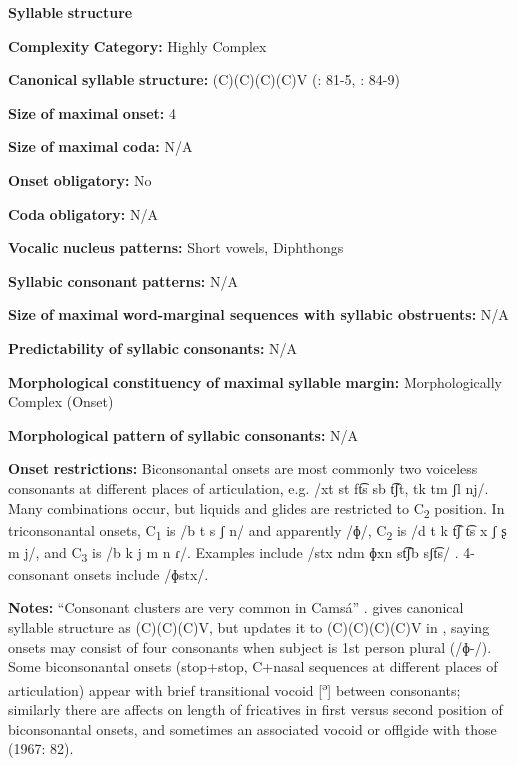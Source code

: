 \textbf{Syllable} \textbf{structure}

\textbf{Complexity} \textbf{Category:} Highly Complex

\textbf{Canonical} \textbf{syllable} \textbf{structure:} (C)(C)(C)(C)V (\citealt{Howard1967}: 81-5, \citealt{Howard1972}: 84-9)

\textbf{Size} \textbf{of} \textbf{maximal} \textbf{onset:} 4

\textbf{Size} \textbf{of} \textbf{maximal} \textbf{coda:} N/A

\textbf{Onset} \textbf{obligatory:} No

\textbf{Coda} \textbf{obligatory:} N/A

\textbf{Vocalic} \textbf{nucleus} \textbf{patterns:} Short vowels, Diphthongs

\textbf{Syllabic} \textbf{consonant} \textbf{patterns:} N/A

\textbf{Size} \textbf{of} \textbf{maximal} \textbf{word{}-marginal sequences with syllabic obstruents:} N/A

\textbf{Predictability} \textbf{of} \textbf{syllabic} \textbf{consonants:} N/A

\textbf{Morphological} \textbf{constituency} \textbf{of} \textbf{maximal} \textbf{syllable} \textbf{margin:} Morphologically Complex (Onset)

\textbf{Morphological} \textbf{pattern} \textbf{of} \textbf{syllabic} \textbf{consonants:} N/A

\textbf{Onset} \textbf{restrictions:} Biconsonantal onsets are most commonly two voiceless consonants at different places of articulation, e.g. /xt st ft͡s sb t͡ʃt, tk tm ʃl nj/. Many combinations occur, but liquids and glides are restricted to C\textsubscript{2} position. In triconsonantal onsets, C\textsubscript{1} is /b t s ʃ n/ and apparently /ɸ/, C\textsubscript{2} is /d t k t͡ʃ t͡s x ʃ ʂ m j/, and C\textsubscript{3} is /b k j m n ɾ/. Examples include /stx ndm ɸxn st͡ʃb sʃt͡s/ . 4-consonant onsets include /ɸstx/.

\textbf{Notes:} “Consonant clusters are very common in Camsá” \citep[81]{Howard1967}. \citet{Howard1967} gives canonical syllable structure as (C)(C)(C)V, but updates it to (C)(C)(C)(C)V in \citet{Howard1972}, saying onsets may consist of four consonants when subject is 1st person plural (/ɸ{}-/). Some biconsonantal onsets (stop+stop, C+nasal sequences at different places of articulation) appear with brief transitional vocoid [\textsuperscript{ə}] between consonants; similarly there are affects on length of fricatives in first versus second position of biconsonantal onsets, and sometimes an associated vocoid or offlgide with those (1967: 82).

